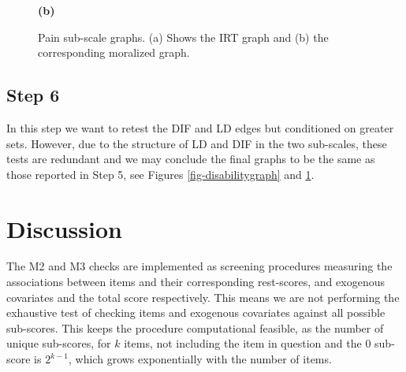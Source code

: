 \documentclass[a4project,12pt]{article}
\theoremstyle{examplestyle}
\theoremstyle{defstyle}
\theoremstyle{thmstyle}
\begin{document}
\begin{figure}[ht]
\begin{minipage}[t]{0.48\textwidth}

\vspace{0.3em}
\textbf{(b)}
\end{minipage}

\caption{
Pain sub-scale graphs. (a) Shows the IRT graph and (b) the corresponding moralized graph.
}\label{fig-paingraph}
\end{figure}


\subsection{Step 6}
In this step we want to retest the DIF and LD edges but conditioned on greater sets. However, due to the structure of LD and DIF in the two sub-scales, these tests are redundant and we may conclude the final graphs to be the same as those reported in Step 5, see Figures \ref{fig-disabilitygraph} and \ref{fig-paingraph}. 



\section{Discussion}
The M2 and M3 checks are implemented as screening procedures measuring the associations between items and their corresponding rest-scores, and exogenous covariates and the total score respectively. This means we are not performing the exhaustive test of checking items and exogenous covariates against all possible sub-scores. This keeps the procedure computational feasible, as the number of unique sub-scores, for $k$ items, not including the item in question and the $0$ sub-score is $2^{k-1}$, which grows exponentially with the number of items. 
\end{document}
